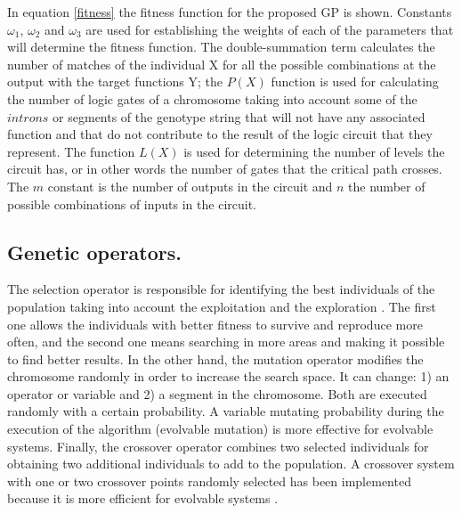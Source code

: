 \documentclass{sig-alternate}
\begin{document}
In equation \ref{fitness} the fitness function for the proposed GP is shown. Constants $\omega_{1}$, $\omega_{2}$ and $\omega_{3}$ are used for establishing the weights of each of the parameters that will determine the fitness function. The double-summation term calculates the number of matches of the individual X for all the possible combinations at the output with the target functions Y; the $P(X)$ function is used for calculating the number of logic gates of a chromosome taking into account some of the $introns$ or segments of the genotype string that will not have any associated function and that do not contribute to the result of the logic circuit that they represent. The function $L(X)$ is used for determining the number of levels the circuit has, or in other words the number of gates that the critical path crosses. The $m$ constant is the number of outputs in the circuit and $n$ the number of possible combinations of inputs in the circuit.

\subsection{Genetic operators.}
The selection operator is responsible for identifying the best individuals of the population taking into account the exploitation and the exploration \cite{QYCC06}. The first one allows the individuals with better fitness to survive and reproduce more often, and the second one means searching in more areas and making it possible to find better results. In the other hand, the mutation operator modifies the chromosome randomly in order to increase the search space. It can change: 1) an operator or variable and 2) a segment in the chromosome. Both are executed randomly with a certain probability. A variable mutating probability during the execution of the algorithm (evolvable mutation) \cite{RKYZ02} is more effective for evolvable systems. Finally, the crossover operator combines two selected individuals for obtaining two additional individuals to add to the population. A crossover system with one or two crossover points randomly selected has been implemented because it is more efficient for evolvable systems \cite{JMPT98b}.


\end{document}
